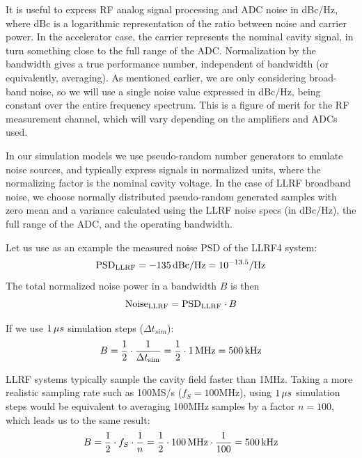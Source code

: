 \documentclass[a4paper,12pt]{article}
\begin{document}
It is useful to express RF analog signal processing and ADC noise in dBc/Hz, where dBc is a logarithmic representation of the ratio between noise and carrier power. In the accelerator case, the carrier represents the nominal cavity signal, in turn something close to the full range of the \hbox{ADC}.  Normalization by the bandwidth gives a true performance number, independent of bandwidth (or equivalently, averaging). As mentioned earlier, we are only considering broad-band noise, so we will use a single noise value expressed in dBc/Hz, being constant over the entire frequency spectrum. This is a figure of merit for the RF measurement channel, which will vary depending on the amplifiers and ADCs used.

In our simulation models we use pseudo-random number generators to emulate noise sources, and typically express signals in normalized units, where the normalizing factor is the nominal cavity voltage. In the case of LLRF broadband noise, we choose normally distributed pseudo-random generated samples with zero mean and a variance calculated using the LLRF noise specs (in dBc/Hz), the full range of the ADC, and the operating bandwidth.

Let us use as an example the measured noise PSD of the LLRF4 system:
\begin{equation}
  \centering {\rm PSD}_{\rm LLRF} = -135\thinspace{\rm dBc/Hz} = 10^{-13.5} {\rm /Hz}
\end{equation}
The total normalized noise power in a bandwidth $B$ is then
\begin{equation}
  \centering {\rm Noise}_{\rm LLRF} ={\rm PSD}_{\rm LLRF}\cdot B
  \label{eq:PSD_to_noise}
\end{equation}

If we use $1\thinspace\mu s$ simulation steps ($\Delta t_{sim}$):
\begin{equation}
  \centering B = \frac{1}{2} \cdot \frac{1}{\Delta t_{\rm sim}}=\frac{1}{2} \cdot 1\thinspace {\rm MHz} = 500\thinspace {\rm kHz}
\end{equation}

LLRF systems typically sample the cavity field faster than 1\thinspace MHz. Taking a more realistic sampling rate such as 100\thinspace MS/s ($f_S=100$\thinspace MHz), using $1\thinspace\mu s$ simulation steps would be equivalent to averaging 100\thinspace MHz samples by a factor $n=100$, which leads us to the same result:
\begin{equation}
  \centering B = \frac{1}{2} \cdot f_S \cdot \frac{1}{n} = \frac{1}{2} \cdot 100\thinspace{\rm MHz} \cdot \frac{1}{100} = 500\thinspace{\rm kHz}
\end{equation}
\end{document}

